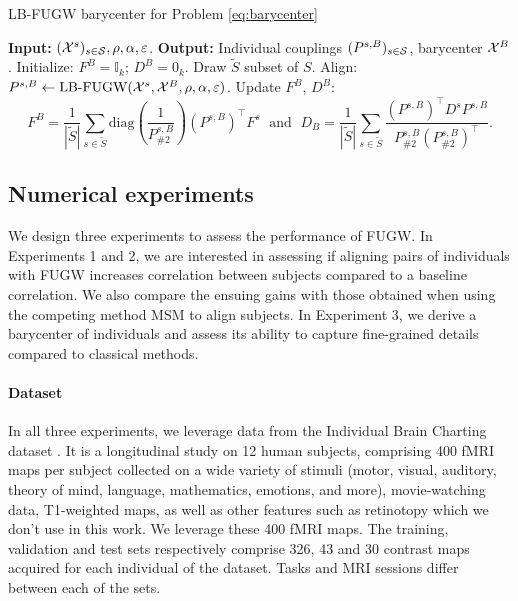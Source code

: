 \begin{algorithm}[t]
    \caption{LB-FUGW barycenter for Problem \eqref{eq:barycenter}}
    \label{alg:fugw_barycenter}
    \begin{algorithmic}[1]
        \STATE \textbf{Input:} $(\mathcal X^s)_{s \in \mathcal S}, \rho, \alpha, \varepsilon$.
        \STATE \textbf{Output:} Individual couplings $(P^{s, B})_{s \in \mathcal S}$, barycenter $\mathcal X^B$.
        \STATE Initialize: $F^B = \mathbb I_k$; $D^B = 0_k$.
            \STATE Draw $\widetilde{S}$ subset of $S$.
                \STATE Align: $P^{s, B} \gets \text{LB-FUGW}(\mathcal X^s, \mathcal X^B, \rho, \alpha, \varepsilon)$.
            \ENDFOR
            \STATE Update $F^B$, $D^B$:
            \begin{equation*}
                F^B = \frac{1}{| \widetilde{S} |} \sum_{s \in \widetilde{S}}
                \text{diag} \left( \frac{1}{P^{s, B}_{\# 2}} \right)
                (P^{s, B})^\top F^s \; \text{ and } \;
                D_B = \frac{1}{| \widetilde{S} |} \sum_{s \in \widetilde{S}}
                \frac{(P^{s, B})^\top D^s P^{s, B}}{P^{s, B}_{\# 2} (P^{s, B}_{\# 2})^\top}.
            \end{equation*}
        \ENDWHILE
    \end{algorithmic}
\end{algorithm}

\subsection{Numerical experiments}

We design three experiments to assess the performance of FUGW.
In Experiments 1 and 2, we are interested in assessing if aligning pairs of individuals with
FUGW increases correlation between subjects compared to a baseline correlation.
We also compare the ensuing gains with those obtained when using the
competing method MSM \citep{robinson_msm_2014,robinson_multimodal_2018} to align subjects.
In Experiment 3, we derive a barycenter of individuals and assess its ability to capture fine-grained
details compared to classical methods.

\paragraph{Dataset}
\label{par:dataset}
In all three experiments, we leverage data from the Individual Brain Charting dataset \citep{ibc}.
It is a longitudinal study on 12 human subjects,
comprising 400 fMRI maps per subject collected
on a wide variety of stimuli (motor, visual, auditory, theory of mind,
language, mathematics, emotions, and more), movie-watching data, T1-weighted maps, as well as other features such as
retinotopy which we don't use in this work. We leverage these 400 fMRI maps.
The training, validation and test sets respectively comprise
326, 43 and 30 contrast maps acquired for each individual of the dataset.
Tasks and MRI sessions differ between each of the sets.

